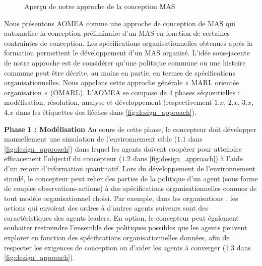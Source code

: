 \begin{figure}[h!]
    \centering
    
    \caption{Aperçu de notre approche de la conception MAS}
    \label{fig:design_approach}
\end{figure}

Nous présentons AOMEA comme une approche de conception de MAS qui automatise la conception préliminaire d'un MAS en fonction de certaines contraintes de conception. Les spécifications organisationnelles obtenues après la formation permettent le développement d'un MAS organisé.
L'idée sous-jacente de notre approche est de considérer qu'une politique commune ou une histoire commune peut être décrite, au moins en partie, en termes de spécifications organisationnelles.
Nous appelons cette approche générale « MARL orientée organisation » (OMARL).
%
%
L'AOMEA se compose de 4 phases séquentielles : modélisation, résolution, analyse et développement (respectivement $1.x$, $2.x$, $3.x$, $4.x$ dans les étiquettes des flèches dans \autoref{fig:design_approach}).

\textbf{Phase 1 : Modélisation} \quad Au cours de cette phase, le concepteur doit développer manuellement une simulation de l'environnement cible ($1.1$ dans \autoref{fig:design_approach}) dans lequel les agents doivent coopérer pour atteindre efficacement l'objectif du concepteur ($1.2$ dans \autoref{fig:design_approach}) à l'aide d'un retour d'information quantitatif. Lors du développement de l'environnement simulé, le concepteur peut relier des parties de la politique d'un agent (sous forme de couples observations-actions) à des spécifications organisationnelles connues de tout modèle organisationnel choisi.
Par exemple, dans les organisations , les actions qui envoient des ordres à d'autres agents suiveurs sont des caractéristiques des agents leaders.
En option, le concepteur peut également souhaiter restreindre l'ensemble des politiques possibles que les agents peuvent explorer en fonction des spécifications organisationnelles données, afin de respecter les exigences de conception ou d'aider les agents à converger (1.3 dans \autoref{fig:design_approach}).


